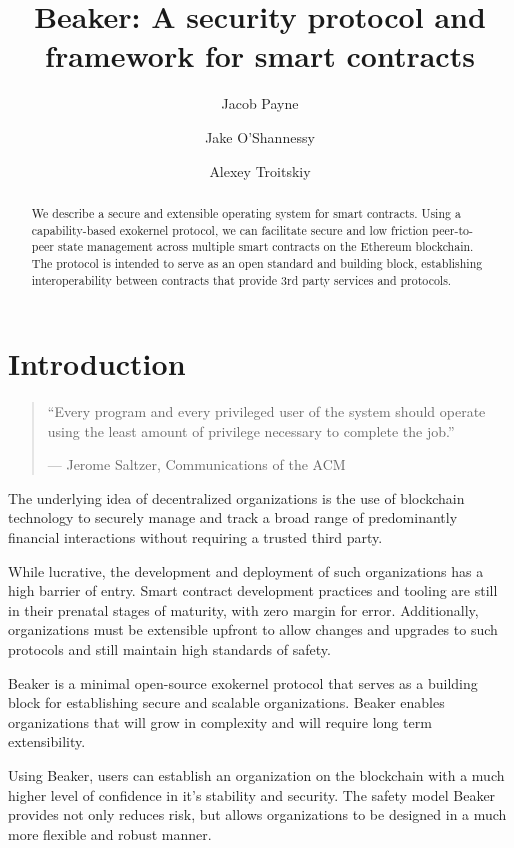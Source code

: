 \documentclass[english,a4paper]{article}
\title{Beaker: A security protocol and framework for smart
contracts}\label{beaker-a-security-protocol-and-framework-for-smart-contracts}
\author{Jacob Payne \and Jake O'Shannessy \and Alexey Troitskiy}
\begin{document}
\maketitle

\begin{abstract}\label{abstract}

We describe a secure and extensible operating system for smart
contracts. Using a capability-based exokernel protocol, we can
facilitate secure and low friction peer-to-peer state management across
multiple smart contracts on the Ethereum blockchain. The protocol is
intended to serve as an open standard and building block, establishing
interoperability between contracts that provide 3rd party services and
protocols.

\end{abstract}

\newpage
\tableofcontents
\newpage

\section{Introduction}\label{introduction}
\begin{quote}
``Every program and every privileged user of the system should operate
using the least amount of privilege necessary to complete the job.''

--- Jerome Saltzer, Communications of the ACM
\end{quote}

The underlying idea of decentralized organizations is the use of
blockchain technology to securely manage and track a broad range of
predominantly financial interactions without requiring a trusted third
party.

While lucrative, the development and deployment of such organizations
has a high barrier of entry. Smart contract development practices and
tooling are still in their prenatal stages of maturity, with zero margin
for error. Additionally, organizations must be extensible upfront to
allow changes and upgrades to such protocols and still maintain high
standards of safety.

Beaker is a minimal open-source exokernel protocol that serves as a
building block for establishing secure and scalable organizations.
Beaker enables organizations that will grow in complexity and will
require long term extensibility.

Using Beaker, users can establish an organization on the blockchain with
a much higher level of confidence in it's stability and security. The
safety model Beaker provides not only reduces risk, but allows
organizations to be designed in a much more flexible and robust manner.
\end{document}
